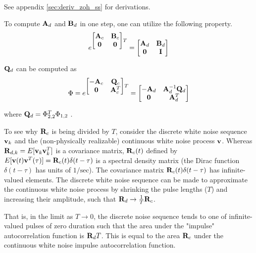 See appendix \ref{sec:deriv_zoh_ss} for derivations.

To compute $\mathbf{A}_d$ and $\mathbf{B}_d$ in one step, one can utilize the
following property.
\begin{equation*}
  e^{
  \begin{bmatrix}
    \mathbf{A}_c & \mathbf{B}_c \\
    \mathbf{0} & \mathbf{0}
  \end{bmatrix}T} =
  \begin{bmatrix}
    \mathbf{A}_d & \mathbf{B}_d \\
    \mathbf{0} & \mathbf{I}
  \end{bmatrix}
\end{equation*}

$\mathbf{Q}_d$ can be computed as
\begin{equation*}
  \Phi = e^{
  \begin{bmatrix}
    -\mathbf{A}_c & \mathbf{Q}_c \\
    \mathbf{0} & \mathbf{A}_c^T
  \end{bmatrix}T} =
  \begin{bmatrix}
    -\mathbf{A}_d & \mathbf{A}_d^{-1} \mathbf{Q}_d \\
    \mathbf{0} & \mathbf{A}_d^T
  \end{bmatrix}
\end{equation*}

where $\mathbf{Q}_d = \Phi_{2,2}^T \Phi_{1,2}$ \cite{bib:integral_matrix_exp}.

To see why $\mathbf{R}_c$ is being divided by $T$, consider the discrete white
noise sequence $\mathbf{v}_k$ and the (non-physically realizable) continuous white
noise process $\mathbf{v}$. Whereas $\mathbf{R}_{d,k} = E[\mathbf{v}_k \mathbf{v}_k^T]$ is a
covariance matrix, $\mathbf{R}_c(t)$ defined by
$E[\mathbf{v}(t) \mathbf{v}^T(\tau)] = \mathbf{R}_c(t)\delta(t - \tau)$ is a spectral
density matrix (the Dirac function $\delta(t - \tau)$ has units of
$1/\text{sec}$). The covariance matrix $\mathbf{R}_c(t)\delta(t - \tau)$ has
infinite-valued elements. The discrete white noise sequence can be made to
approximate the continuous white noise process by shrinking the pulse lengths
($T$) and increasing their amplitude, such that
$\mathbf{R}_d \rightarrow \frac{1}{T}\mathbf{R}_c$.

That is, in the limit as $T \rightarrow 0$, the discrete noise sequence tends to
one of infinite-valued pulses of zero duration such that the area under the
"impulse" autocorrelation function is $\mathbf{R}_d T$. This is equal to the area
$\mathbf{R}_c$ under the continuous white noise impulse autocorrelation function.
